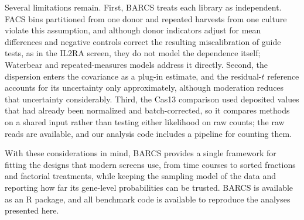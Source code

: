 Several limitations remain.  First, BARCS treats each library as independent.
FACS bins partitioned from one donor and repeated harvests from one culture
violate this assumption, and although donor indicators adjust for mean
differences and negative controls correct the resulting miscalibration of
guide tests, as in the IL2RA screen, they do not model the dependence itself;
Waterbear and repeated-measures models address it directly.  Second, the
dispersion enters the covariance as a plug-in estimate, and the residual-$t$
reference accounts for its uncertainty only approximately, although
moderation reduces that uncertainty considerably.  Third, the Cas13 comparison used
deposited values that had already been normalized and batch-corrected, so it
compares methods on a shared input rather than testing either likelihood on
raw counts; the raw reads are available, and our analysis code includes a
pipeline for counting them.

With these considerations in mind, BARCS provides a single framework for
fitting the designs that modern screens use, from time courses to sorted
fractions and factorial treatments, while keeping the sampling model of the
data and reporting how far its gene-level probabilities can be trusted.  BARCS
is available as an R package, and all benchmark code is available to
reproduce the analyses presented here.
